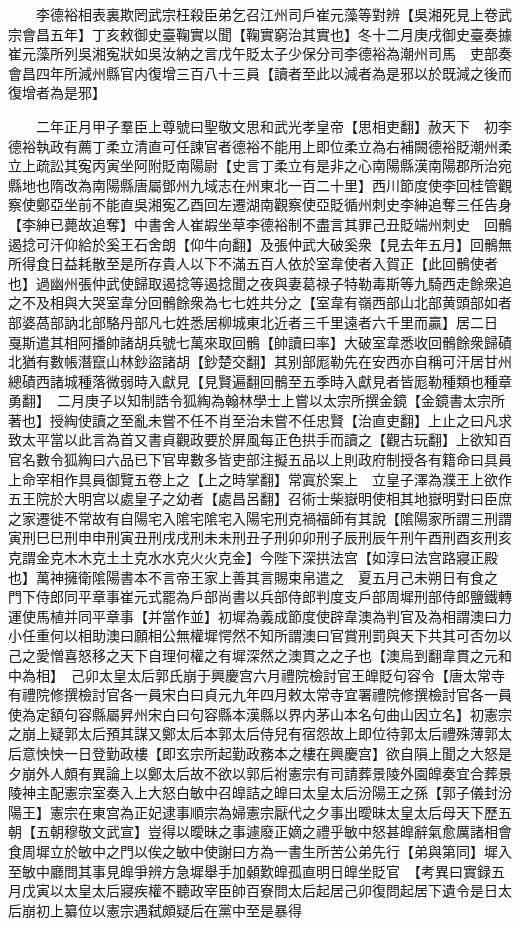 　　李德裕相表裏欺罔武宗枉殺臣弟乞召江州司戶崔元藻等對辨【吳湘死見上卷武宗會昌五年】丁亥敕御史臺鞠實以聞【鞠實窮治其實也】冬十二月庚戌御史臺奏據崔元藻所列吳湘寃狀如吳汝納之言戊午貶太子少保分司李德裕為潮州司馬　吏部奏會昌四年所減州縣官内復增三百八十三員【讀者至此以減者為是邪以於既減之後而復增者為是邪】

　　二年正月甲子羣臣上尊號曰聖敬文思和武光孝皇帝【思相吏翻】赦天下　初李德裕執政有薦丁柔立清直可任諫官者德裕不能用上即位柔立為右補闕德裕貶潮州柔立上疏訟其寃丙寅坐阿附貶南陽尉【史言丁柔立有是非之心南陽縣漢南陽郡所治宛縣地也隋改為南陽縣唐屬鄧州九域志在州東北一百二十里】西川節度使李回桂管觀察使鄭亞坐前不能直吳湘寃乙酉回左遷湖南觀察使亞貶循州刺史李紳追奪三任告身【李紳已薨故追奪】中書舍人崔嘏坐草李德裕制不盡言其罪己丑貶端州刺史　回鶻遏捻可汗仰給於奚王石舍朗【仰牛向翻】及張仲武大破奚衆【見去年五月】回鶻無所得食日益耗散至是所存貴人以下不滿五百人依於室韋使者入賀正【此回鶻使者也】過幽州張仲武使歸取遏捻等遏捻聞之夜與妻葛禄子特勒毒斯等九騎西走餘衆追之不及相與大哭室韋分回鶻餘衆為七七姓共分之【室韋有嶺西部山北部黄頭部如者部婆萵部訥北部駱丹部凡七姓悉居柳城東北近者三千里遠者六千里而贏】居二日戛斯遣其相阿播帥諸胡兵號七萬來取回鶻【帥讀曰率】大破室韋悉收回鶻餘衆歸磧北猶有數帳潛竄山林鈔盜諸胡【鈔楚交翻】其别部厖勒先在安西亦自稱可汗居甘州總磧西諸城種落微弱時入獻見【見賢遍翻回鶻至五季時入獻見者皆厖勒種類也種章勇翻】　二月庚子以知制誥令狐綯為翰林學士上嘗以太宗所撰金鏡【金鏡書太宗所著也】授綯使讀之至亂未嘗不任不肖至治未嘗不任忠賢【治直吏翻】上止之曰凡求致太平當以此言為首又書貞觀政要於屏風每正色拱手而讀之【觀古玩翻】上欲知百官名數令狐綯曰六品已下官卑數多皆吏部注擬五品以上則政府制授各有籍命曰具員上命宰相作具員御覽五卷上之【上之時掌翻】常寘於案上　立皇子澤為濮王上欲作五王院於大明宫以處皇子之幼者【處昌呂翻】召術士柴嶽明使相其地嶽明對曰臣庶之家遷徙不常故有自陽宅入隂宅隂宅入陽宅刑克禍福師有其說【隂陽家所謂三刑謂寅刑巳巳刑申申刑寅丑刑戌戌刑未未刑丑子刑卯卯刑子辰刑辰午刑午酉刑酉亥刑亥克謂金克木木克土土克水水克火火克金】今陛下深拱法宫【如淳曰法宫路寢正殿也】萬神擁衛隂陽書本不言帝王家上善其言賜束帛遣之　夏五月己未朔日有食之　門下侍郎同平章事崔元式罷為戶部尚書以兵部侍郎判度支戶部周墀刑部侍郎鹽鐵轉運使馬植并同平章事【并當作並】初墀為義成節度使辟韋澳為判官及為相謂澳曰力小任重何以相助澳曰願相公無權墀愕然不知所謂澳曰官賞刑罰與天下共其可否勿以己之愛憎喜怒移之天下自理何權之有墀深然之澳貫之之子也【澳烏到翻韋貫之元和中為相】　己卯太皇太后郭氏崩于興慶宫六月禮院檢討官王皥貶句容令【唐太常寺有禮院修撰檢討官各一員宋白曰貞元九年四月敕太常寺宜署禮院修撰檢討官各一員使為定額句容縣屬昇州宋白曰句容縣本漢縣以界内茅山本名句曲山因立名】初憲宗之崩上疑郭太后預其謀又鄭太后本郭太后侍兒有宿怨故上即位待郭太后禮殊薄郭太后意怏怏一日登勤政樓【即玄宗所起勤政務本之樓在興慶宫】欲自隕上聞之大怒是夕崩外人頗有異論上以鄭太后故不欲以郭后袝憲宗有司請葬景陵外園皥奏宜合葬景陵神主配憲宗室奏入上大怒白敏中召皥詰之皥曰太皇太后汾陽王之孫【郭子儀封汾陽王】憲宗在東宫為正妃逮事順宗為婦憲宗厭代之夕事出曖昧太皇太后母天下歷五朝【五朝穆敬文武宣】豈得以曖昧之事遽廢正嫡之禮乎敏中怒甚皥辭氣愈厲諸相會食周墀立於敏中之門以俟之敏中使謝曰方為一書生所苦公弟先行【弟與第同】墀入至敏中廳問其事見皥爭辨方急墀舉手加顙歎皥孤直明日皥坐貶官　【考異曰實録五月戊寅以太皇太后寢疾權不聽政宰臣帥百寮問太后起居己卯復問起居下遺令是日太后崩初上纂位以憲宗遇弑頗疑后在黨中至是暴得